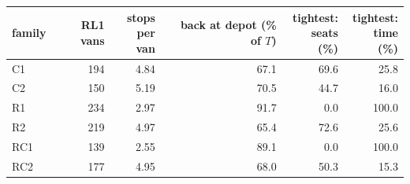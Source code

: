 \begin{tabular}{@{}lrrrrr@{}}
\toprule
family & RL1 vans & \shortstack[r]{stops\\per van} & \shortstack[r]{back at depot\\(\% of $T$)} & \shortstack[r]{tightest:\\seats (\%)} & \shortstack[r]{tightest:\\time (\%)} \\
\midrule
C1 & 194 & 4.84 & 67.1 & 69.6 & 25.8 \\
C2 & 150 & 5.19 & 70.5 & 44.7 & 16.0 \\
R1 & 234 & 2.97 & 91.7 & 0.0 & 100.0 \\
R2 & 219 & 4.97 & 65.4 & 72.6 & 25.6 \\
RC1 & 139 & 2.55 & 89.1 & 0.0 & 100.0 \\
RC2 & 177 & 4.95 & 68.0 & 50.3 & 15.3 \\
\bottomrule
\end{tabular}
